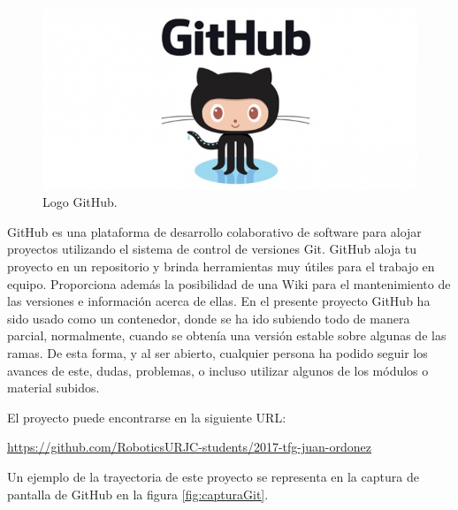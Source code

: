 \begin{figure}[H]
	\center
	\includegraphics[trim = 0mm 0mm 0mm 0mm, clip,scale=0.4]{imagenes/Introduction/github}
	\caption{Logo GitHub.}
	\label{fig:github}
\end{figure}


GitHub es una plataforma de desarrollo colaborativo de software para alojar proyectos utilizando el sistema de control de versiones Git. GitHub aloja tu proyecto en un repositorio y brinda herramientas muy útiles para el trabajo en equipo. \newline
Proporciona además la posibilidad de una Wiki para el mantenimiento de las versiones e información acerca de ellas. \newline
En el presente proyecto GitHub ha sido usado como un contenedor, donde se ha ido subiendo todo de manera parcial, normalmente, cuando se obtenía una versión estable sobre algunas de las ramas. \newline
De esta forma, y al ser abierto, cualquier persona ha podido seguir los avances de este, dudas, problemas, o incluso utilizar algunos de los módulos o material subidos. \newline
 
El proyecto puede encontrarse en la siguiente URL: \newline

\hyperref[]{https://github.com/RoboticsURJC-students/2017-tfg-juan-ordonez}

Un ejemplo de la trayectoria de este proyecto se representa en la captura de pantalla de GitHub en la figura \ref{fig:capturaGit}.

